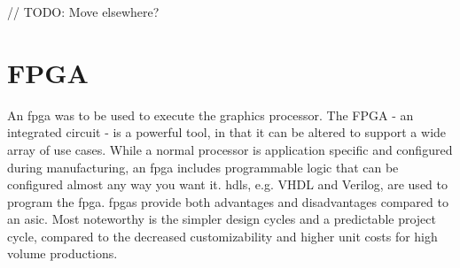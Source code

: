 // TODO: Move elsewhere?
\section{FPGA}
An \gls{fpga} was to be used to execute the graphics processor.
The FPGA - an integrated circuit - is a powerful tool, in that it can be altered to support a wide array of use cases.
While a normal processor is application specific and configured during manufacturing, an \gls{fpga} includes programmable logic that can be configured almost any way you want it\cite{fpga}.
\gls{hdl}s, e.g. VHDL and Verilog, are used to program the \gls{fpga}.
\gls{fpga}s provide both advantages and disadvantages compared to an \gls{asic}.
Most noteworthy is the simpler design cycles and a predictable project cycle, compared to the decreased customizability and higher unit costs for high volume productions\cite{fpgavsasic}.
